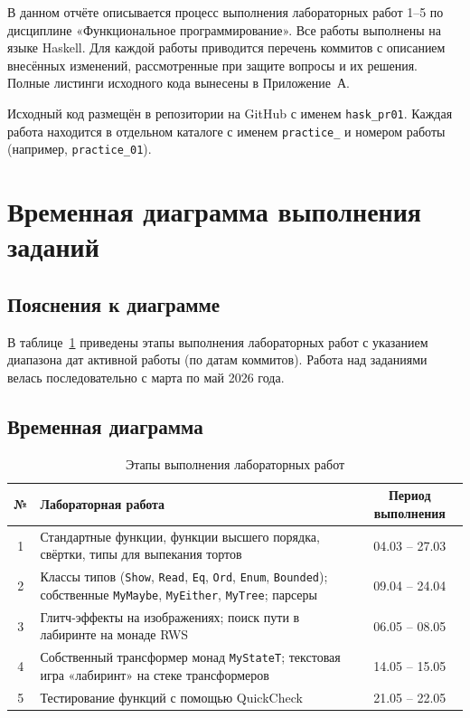 \documentclass[a4paper, final]{article}
\begin{document}
В данном отчёте описывается процесс выполнения лабораторных работ 1--5 по
дисциплине «Функциональное программирование». Все работы выполнены на языке
Haskell. Для каждой работы приводится перечень коммитов с описанием внесённых
изменений, рассмотренные при защите вопросы и их решения. Полные листинги
исходного кода вынесены в Приложение~А.

Исходный код размещён в репозитории на GitHub с именем \texttt{hask\_pr01}.
Каждая работа находится в отдельном каталоге с именем \texttt{practice\_} и
номером работы (например, \texttt{practice\_01}).

\section{Временная диаграмма выполнения заданий}

\subsection{Пояснения к диаграмме}

В таблице~\ref{tab:timeline} приведены этапы выполнения лабораторных работ с
указанием диапазона дат активной работы (по датам коммитов). Работа над
заданиями велась последовательно с марта по май 2026 года.

\subsection{Временная диаграмма}

\begin{table}[h]
\centering
\caption{Этапы выполнения лабораторных работ}
\label{tab:timeline}
\begin{tabular}{|c|p{8cm}|c|}
\hline
\textbf{№} & \textbf{Лабораторная работа} & \textbf{Период выполнения} \\
\hline
1 & Стандартные функции, функции высшего порядка, свёртки, типы для выпекания тортов
  & 04.03 -- 27.03 \\
\hline
2 & Классы типов (\texttt{Show}, \texttt{Read}, \texttt{Eq}, \texttt{Ord},
    \texttt{Enum}, \texttt{Bounded}); собственные \texttt{MyMaybe},
    \texttt{MyEither}, \texttt{MyTree}; парсеры
  & 09.04 -- 24.04 \\
\hline
3 & Глитч-эффекты на изображениях; поиск пути в лабиринте на монаде RWS
  & 06.05 -- 08.05 \\
\hline
4 & Собственный трансформер монад \texttt{MyStateT}; текстовая игра «лабиринт»
    на стеке трансформеров
  & 14.05 -- 15.05 \\
\hline
5 & Тестирование функций с помощью QuickCheck
  & 21.05 -- 22.05 \\
\hline
\end{tabular}
\end{table}
\end{document}
